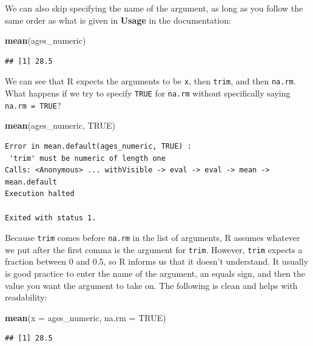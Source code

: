 \documentclass[]{tufte-book}
\newenvironment{Shaded}{\begin{snugshade}}{\end{snugshade}}
\newcommand{\AttributeTok}[1]{\textcolor[rgb]{0.13,0.29,0.53}{#1}}
\newcommand{\ConstantTok}[1]{\textcolor[rgb]{0.56,0.35,0.01}{#1}}
\newcommand{\FunctionTok}[1]{\textcolor[rgb]{0.13,0.29,0.53}{\textbf{#1}}}
\newcommand{\NormalTok}[1]{#1}
\begin{document}
We can also skip specifying the name of the argument, as long as you follow the same order as what is given in \textbf{Usage} in the documentation:

\begin{Shaded}
\begin{Highlighting}[]
\FunctionTok{mean}\NormalTok{(ages\_numeric)}
\end{Highlighting}
\end{Shaded}

\begin{verbatim}
## [1] 28.5
\end{verbatim}

We can see that R expects the arguments to be \texttt{x}, then \texttt{trim}, and then \texttt{na.rm}. What happens if we try to specify \texttt{TRUE} for \texttt{na.rm} without specifically saying \texttt{na.rm\ =\ TRUE}?

\begin{Shaded}
\begin{Highlighting}[]
\FunctionTok{mean}\NormalTok{(ages\_numeric, }\ConstantTok{TRUE}\NormalTok{)}
\end{Highlighting}
\end{Shaded}

\begin{verbatim}
Error in mean.default(ages_numeric, TRUE) :
 'trim' must be numeric of length one
Calls: <Anonymous> ... withVisible -> eval -> eval -> mean -> mean.default
Execution halted

Exited with status 1.
\end{verbatim}

Because \texttt{trim} comes before \texttt{na.rm} in the list of arguments, R assumes whatever we put after the first comma is the argument for \texttt{trim}. However, \texttt{trim} expects a fraction between 0 and 0.5, so R informs us that it doesn't understand. It usually is good practice to enter the name of the argument, an equals sign, and then the value you want the argument to take on. The following is clean and helps with readability:

\begin{Shaded}
\begin{Highlighting}[]
\FunctionTok{mean}\NormalTok{(}\AttributeTok{x =}\NormalTok{ ages\_numeric, }\AttributeTok{na.rm =} \ConstantTok{TRUE}\NormalTok{)}
\end{Highlighting}
\end{Shaded}

\begin{verbatim}
## [1] 28.5
\end{verbatim}
\end{document}
